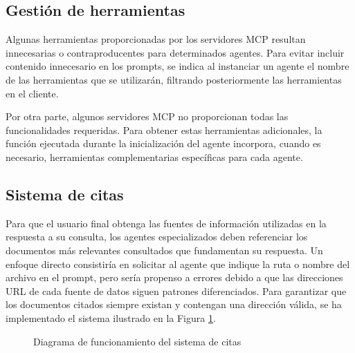 \subsection{Gestión de herramientas}
Algunas herramientas proporcionadas por los servidores MCP resultan innecesarias o contraproducentes para determinados agentes. Para evitar incluir contenido innecesario en los prompts, se indica al instanciar un agente el nombre de las herramientas que se utilizarán, filtrando posteriormente las herramientas en el cliente.

Por otra parte, algunos servidores MCP no proporcionan todas las funcionalidades requeridas. Para obtener estas herramientas adicionales, la función  ejecutada durante la inicialización del agente incorpora, cuando es necesario, herramientas complementarias específicas para cada agente.

\subsection{Sistema de citas}
\label{sec:citas}

Para que el usuario final obtenga las fuentes de información utilizadas en la respuesta a su consulta, los agentes especializados deben referenciar los documentos más relevantes consultados que fundamentan su respuesta. Un enfoque directo consistiría en solicitar al agente que indique la ruta o nombre del archivo en el prompt, pero sería propenso a errores debido a que las direcciones URL de cada fuente de datos siguen patrones diferenciados. Para garantizar que los documentos citados siempre existan y contengan una dirección válida, se ha implementado el sistema ilustrado en la Figura \ref{fig:citations}.

\begin{figure}[h]
\centering
{}
\caption{Diagrama de funcionamiento del sistema de citas}
\label{fig:citations}
\end{figure}

